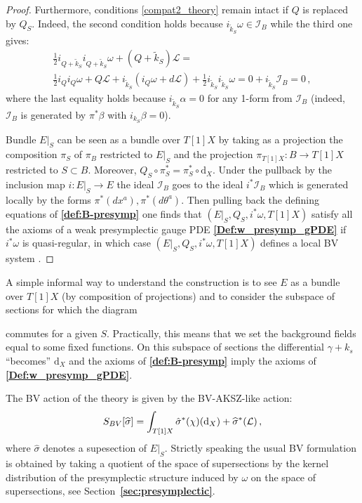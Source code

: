 \documentclass[a4paper,12pt]{article}
\numberwithin{equation}{section} %
\renewcommand{\tilde}{\widetilde}
\renewcommand{\hat}{\widehat}
\newcommand{\bref}[1]{\textbf{\ref{#1}}}
\newcommand{\dx}{\mathrm{d}_X}
\def\cI{\mathcal{I}}
\def\cL{\mathcal{L}}
\begin{document}
\begin{proof}
Furthermore, conditions \eqref{compat2_theory} remain intact if $Q$ is replaced by $Q_S$. Indeed, the second condition holds because $i_{{\tilde{k}_S}} \omega \in \cI_B$ while the third one gives:
\begin{multline}
        \frac{1}{2}i_{Q+{\tilde{k}_S}} i_{Q+{\tilde{k}_S}} \omega + (Q+{\tilde{k}_S})\cL = \\
        \frac{1}{2}i_Q i_Q \omega + Q \cL + i_{\tilde{k}_S}(i_Q\omega +d\cL)+ \frac{1}{2}i_{\tilde{k}_S}i_{\tilde{k}_S}\omega  
        = 0 + i_{\tilde{k}_S}\cI_B = 0\,,
\end{multline}
where the last equality holds because $i_{\tilde{k}_S} \alpha=0$ for any 1-form from $\cI_B$ (indeed, $\cI_B$ is generated by $\pi^*\beta$ with $i_{{k}_S}\beta =0$).    

Bundle $E|_{S}$ can be seen as a bundle over $T[1]X$ by taking as a projection the composition $\pi_S$ of ${\pi_B}$ restricted to $E|_{S}$ and the projection $\pi_{T[1]X}:B\to T[1]X$ restricted to $S\subset B$. Moreover, $Q_S\circ \pi_S^* = \pi_S^* \circ \dx $. Under the pullback by the inclusion map $i: E|_S \rightarrow E$ the ideal $\cI_B$ goes to the ideal $i^*\cI_B$ which is generated locally by the forms $\pi^*(dx^a), \pi^*(d\theta^a)$. Then pulling back the defining equations of \bref{def:B-presymp} one finds that $(E|_S, Q_S, i^*\omega, T[1]X)$ satisfy all the axioms of a weak presymplectic gauge PDE \bref{Def:w_presymp_gPDE} if $i^* \omega$ is quasi-regular, in which case $(E|_S, Q_S, i^*\omega, T[1]X)$ defines a local BV system \cite{Grigoriev:2022zlq, Dneprov:2024cvt}. 
\end{proof}

A simple informal way to understand the construction is to see $E$ as a bundle over $T[1]X$ (by composition of projections) and to consider the subspace of sections for which the diagram 
commutes for a given $S$. Practically, this means that we set the background fields equal to some fixed functions. On this subspace of sections the differential $\gamma + k_s$ ``becomes'' $\dx$ and the axioms of \bref{def:B-presymp} imply the axioms of \bref{Def:w_presymp_gPDE}. 

The BV action of the theory is given by the BV-AKSZ-like action:
\begin{equation} \label{act_back_restr}
    S_{BV} [\hat{\sigma}] = \int_{T[1]X} \Hat{\sigma}^*(\chi)(\dx) + \hat\sigma^*(\cL)\,,
\end{equation}
where $\hat{\sigma}$ denotes a supesection of $E|_S$. Strictly speaking the usual BV formulation is obtained by taking a quotient of the space of supersections by the kernel distribution of the presymplectic structure induced by $\omega$ on the space of supersections, see Section~\bref{sec:presymplectic}.
\end{document}
